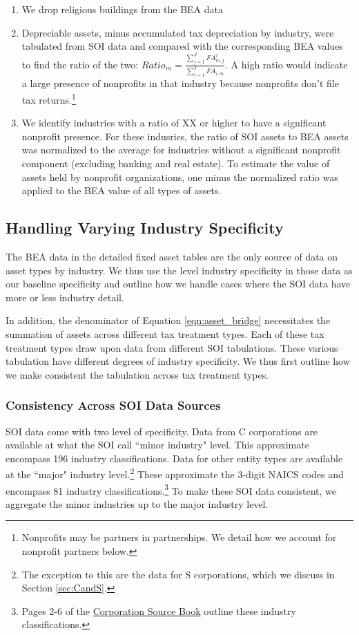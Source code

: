 \documentclass[article,11pt,letterpaper,fleqn]{article}
\theoremstyle{definition}
\numberwithin{equation}{section}
\begin{document}
\begin{enumerate}
\item We drop religious buildings from the BEA data
\item Depreciable assets, minus accumulated tax depreciation by industry, were tabulated from SOI data and compared with the corresponding BEA values to find the ratio of the two: $Ratio_{m}=\frac{\sum_{j=1}^{J}FA^{\tau}_{m,j}}{\sum_{i=1}^{I}FA_{i,m}}$.  A high ratio would indicate a large presence of nonprofits in that industry because nonprofits don't file tax returns.\footnote{Nonprofits may be partners in partnerships.  We detail how we account for nonprofit partners below.}
\item We identify industries with a ratio of XX or higher to have a significant nonprofit presence.  For these indusries, the ratio of SOI assets to BEA assets was normalized to the average for industries without a significant nonprofit component (excluding banking and real estate). To estimate the value of assets held by nonprofit organizations, one minus the normalized ratio was applied to the BEA value of all types of assets.
\end{enumerate}


\subsection{Handling Varying Industry Specificity}

The BEA data in the detailed fixed asset tables are the only source of data on asset types by industry.  We thus use the level industry specificity in those data as our baseline specificity and outline how we handle cases where the SOI data have more or less industry detail.  

In addition, the denominator of Equation \ref{eqn:asset_bridge} necessitates the summation of assets across different tax treatment types. Each of these tax treatment types draw upon data from different SOI tabulations.  These various tabulation have different degrees of industry specificity.  We thus first outline how we make consistent the tabulation across tax treatment types.

\subsubsection{Consistency Across SOI Data Sources}

SOI data come with two level of specificity.  Data from C corporations are available at what the SOI call ``minor industry" level.  This approximate encompass 196 industry classifications.  Data for other entity types are available at the ``major" industry level.\footnote{The exception to this are the data for S corporations, which we discuss in Section \ref{sec:CandS}.}  These approximate the 3-digit NAICS codes and encompass 81 industry classifications.\footnote{Pages 2-6 of the \href{https://www.irs.gov/pub/irs-soi/13cosbsec1.pdf}{Corporation Source Book} outline these industry classifications.}  To make these SOI data consistent, we aggregate the minor industries up to the major industry level.
\end{document}
